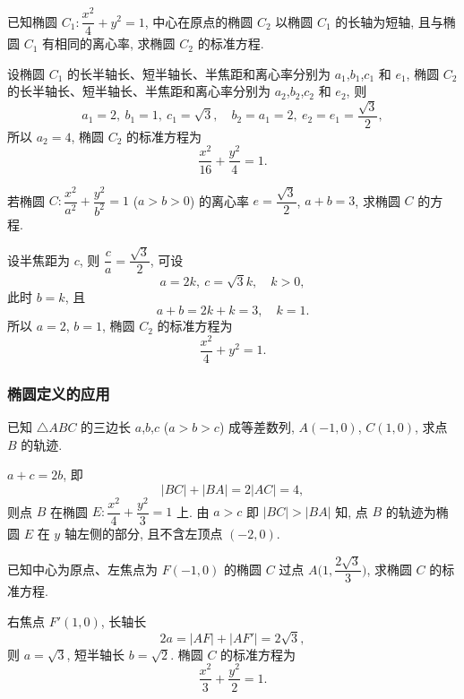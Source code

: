\lianxi
\begin{exercise}
    已知椭圆 $C_1 \colon \dfrac{x^2}4+y^2=1$, 中心在原点的椭圆 $C_2$ 以椭圆 $C_1$ 的长轴为短轴, 且与椭圆 $C_1$ 有相同的离心率, 求椭圆 $C_2$ 的标准方程.
\end{exercise}
\beginsolution
    设椭圆 $C_1$ 的长半轴长、短半轴长、半焦距和离心率分别为 $a_1$,$b_1$,$c_1$ 和 $e_1$, 椭圆 $C_2$ 的长半轴长、短半轴长、半焦距和离心率分别为 $a_2$,$b_2$,$c_2$ 和 $e_2$, 则
    \[a_1=2,\ b_1= 1,\ c_1= \sqrt3,\quad
    b_2= a_1= 2,\ e_2=e_1= \frac{\sqrt3}{2},\]
    所以 $a_2= 4$, 椭圆 $C_2$ 的标准方程为
    \[\frac{x^2}{16}+\frac{y^2}{4}= 1.\]
\endsolution

\begin{exercise}
    若椭圆 $C\colon \dfrac{x^2}{a^2}+\dfrac{y^2}{b^2}=1$ ($a>b>0$) 的离心率 $e=\dfrac{\sqrt3}2$, $a+b=3$, 求椭圆 $C$ 的方程.
\end{exercise}
\beginsolution
    设半焦距为 $c$, 则 $\dfrac{c}a= \dfrac{\sqrt3}2$, 可设
    \[a= 2k,\ c=\sqrt3 k,\quad k>0,\]
    此时 $b=k$, 且
    \[a+b= 2k+k= 3,\quad k=1.\]
    所以 $a=2$, $b=1$, 椭圆 $C_2$ 的标准方程为
    \[\frac{x^2}4+ y^2= 1.\]
\endsolution

\subsubsection{椭圆定义的应用}
\begin{example}
    已知 $\triangle ABC$ 的三边长 $a$,$b$,$c$ ($a>b>c$) 成等差数列, $A(-1,0)$, $C(1,0)$, 求点 $B$ 的轨迹.
\end{example}
\beginsolution
    $a+c= 2b$, 即
    \[|BC|+ |BA|= 2|AC|= 4,\]
    则点 $B$ 在椭圆 $E\colon \dfrac{x^2}4+ \dfrac{y^2}3= 1$ 上. 由 $a>c$ 即 $|BC|> |BA|$ 知, 点 $B$ 的轨迹为椭圆 $E$ 在 $y$ 轴左侧的部分, 且不含左顶点 $(-2,0)$. 
\endsolution

\lianxi
\begin{exercise}
    已知中心为原点、左焦点为 $F(-1,0)$ 的椭圆 $C$ 过点 $A\biggl(1,\dfrac{2\sqrt3}3\biggr)$, 求椭圆 $C$ 的标准方程.
\end{exercise}
\beginsolution
    右焦点 $F'(1,0)$, 长轴长
    \[2a= |AF|+|AF'|= 2\sqrt3,\]
    则 $a= \sqrt3$, 短半轴长 $b=\sqrt2$. 椭圆 $C$ 的标准方程为
    \[\frac{x^2}3+ \frac{y^2}2= 1.\]
\endsolution

